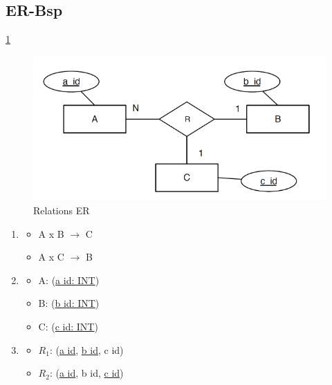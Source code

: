 \subsection{ER-Bsp}
\ref{img:Relations-ER}
\begin{figure}
	\centering
	\includegraphics[width = 16cm]{./Database/Images/2_3a.png}
	\caption{Relations ER}
	\label{img:Relations-ER}
\end{figure}
\begin{enumerate}
	\item
	\begin{itemize}
		\item A x B \(\to\) C
		\item A x C \(\to\) B
	\end{itemize}
	\item
	\begin{itemize}
		\item A: (\underline{a id: INT})
		\item B: (\underline{b id: INT})
		\item C: (\underline{c id: INT})
	\end{itemize}
	\item
	\begin{itemize}
		\item \(R_1\): (\underline{a id}, \underline{b id}, c id)
		\item \(R_2\): (\underline{a id}, b id, \underline{c id})
	\end{itemize}
\end{enumerate}
